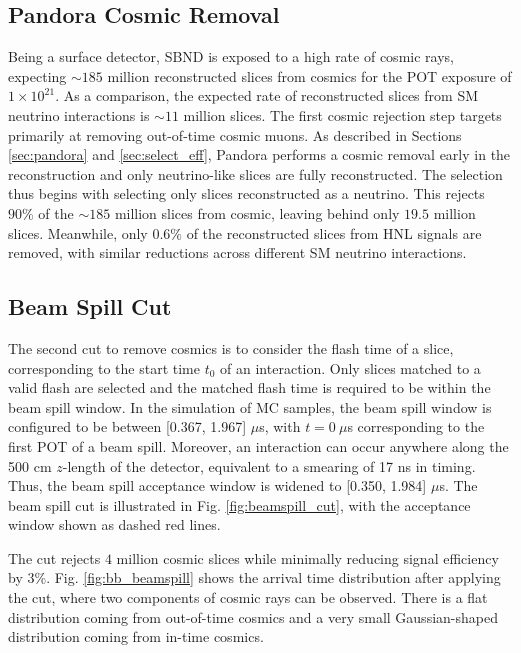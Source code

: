 \subsection{Pandora Cosmic Removal}
\label{sec:cosmic_pandora}

Being a surface detector, SBND is exposed to a high rate of cosmic rays, expecting $\sim 185$ million reconstructed slices from cosmics for the POT exposure of $1 \times 10^{21}$.
As a comparison, the expected rate of reconstructed slices from SM neutrino interactions is $\sim 11$ million slices.
The first cosmic rejection step targets primarily at removing out-of-time cosmic muons.
As described in Sections \ref{sec:pandora} and \ref{sec:select_eff}, Pandora performs a cosmic removal early in the reconstruction and only neutrino-like slices are fully reconstructed. 
The selection thus begins with selecting only slices reconstructed as a neutrino.
This rejects $90 \%$ of the $\sim 185$ million slices from cosmic, leaving behind only $19.5$ million slices.
Meanwhile, only $0.6 \%$ of the reconstructed slices from HNL signals are removed, with similar reductions across different SM neutrino interactions.  

\subsection{Beam Spill Cut}
\label{sec:cosmic_spill}

The second cut to remove cosmics is to consider the flash time of a slice, corresponding to the start time $t_0$ of an interaction. 
Only slices matched to a valid flash are selected and the matched flash time is required to be within the beam spill window.
In the simulation of MC samples, the beam spill window is configured to be between [0.367, 1.967] $\mu$s, with $t = 0\ \mu$s corresponding to the first POT of a beam spill.
Moreover, an interaction can occur anywhere along the 500 cm $z$-length of the detector, equivalent to a smearing of 17 ns in timing.
Thus, the beam spill acceptance window is widened to [0.350, 1.984] $\mu$s.
The beam spill cut is illustrated in Fig. \ref{fig:beamspill_cut}, with the acceptance window shown as dashed red lines.

The cut rejects $4$ million cosmic slices while minimally reducing signal efficiency by $3\%$.
Fig. \ref{fig:bb_beamspill} shows the arrival time distribution after applying the cut, where two components of cosmic rays can be observed.
There is a flat distribution coming from out-of-time cosmics and a very small Gaussian-shaped distribution coming from in-time cosmics.

